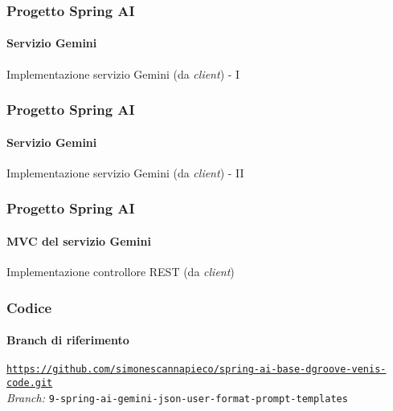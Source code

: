 %
\begin{frame}[t,fragile] \frametitle{Progetto Spring AI}
    \framesubtitle{Servizio Gemini}
		\vspace*{-.7cm}
        \begin{block}{Implementazione servizio Gemini (da \textit{client}) - I}
{\tiny}
    \end{block}
\end{frame}
%
\begin{frame}[t,fragile] \frametitle{Progetto Spring AI}
    \framesubtitle{Servizio Gemini}
    	\vspace*{-.7cm}
        \begin{block}{Implementazione servizio Gemini (da \textit{client}) - II}
{\tiny}
    \end{block}
\end{frame}
%
\begin{frame}[t,fragile] \frametitle{Progetto Spring AI}
    \framesubtitle{MVC del servizio Gemini}
    	\vspace*{-.7cm}
        \begin{block}{Implementazione controllore REST (da \textit{client})}
			{\tiny}
    	\end{block}
\end{frame}
%
\begin{frame}[fragile] \frametitle{Codice}
    \framesubtitle{Branch di riferimento}
	\begin{center}
		{\scriptsize \href{https://github.com/simonescannapieco/spring-ai-base-dgroove-venis-code.git}{\texttt{https://github.com/simonescannapieco/spring-ai-base-dgroove-venis-code.git}}}\\
		\textit{Branch:} \alert{\texttt{9-spring-ai-gemini-json-user-format-prompt-templates}}
	\end{center}
\end{frame}